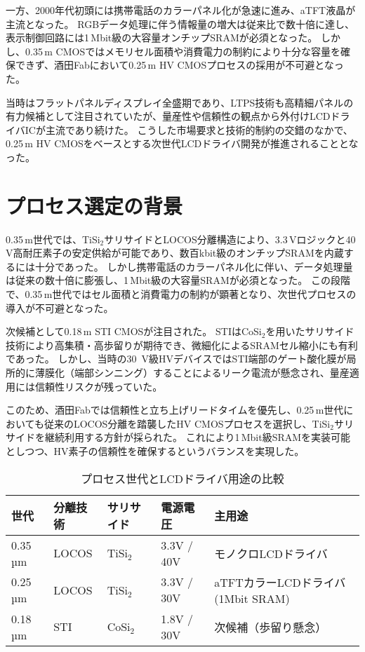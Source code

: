 \documentclass[conference]{IEEEtran}
\begin{document}
一方、2000年代初頭には携帯電話のカラーパネル化が急速に進み、aTFT液晶が主流となった。  
RGBデータ処理に伴う情報量の増大は従来比で数十倍に達し、表示制御回路には1\,Mbit級の大容量オンチップSRAMが必須となった。  
しかし、0.35\,\textmu m CMOSではメモリセル面積や消費電力の制約により十分な容量を確保できず、酒田Fabにおいて0.25\,\textmu m HV CMOSプロセスの採用が不可避となった。  

当時はフラットパネルディスプレイ全盛期であり、LTPS技術も高精細パネルの有力候補として注目されていたが、量産性や信頼性の観点から外付けLCDドライバICが主流であり続けた。  
こうした市場要求と技術的制約の交錯のなかで、0.25\,\textmu m HV CMOSをベースとする次世代LCDドライバ開発が推進されることとなった。

\section{プロセス選定の背景}
0.35\,\textmu m世代では、TiSi$_2$サリサイドとLOCOS分離構造により、3.3\,Vロジックと40\,V高耐圧素子の安定供給が可能であり、数百kbit級のオンチップSRAMを内蔵するには十分であった。  
しかし携帯電話のカラーパネル化に伴い、データ処理量は従来の数十倍に膨張し、1\,Mbit級の大容量SRAMが必須となった。  
この段階で、0.35\,\textmu m世代ではセル面積と消費電力の制約が顕著となり、次世代プロセスの導入が不可避となった。  

次候補として0.18\,\textmu m STI CMOSが注目された。  
STIはCoSi$_2$を用いたサリサイド技術により高集積・高歩留りが期待でき、微細化によるSRAMセル縮小にも有利であった。  
しかし、当時の\SI{30}{V}級HVデバイスではSTI端部のゲート酸化膜が局所的に薄膜化（端部シンニング）することによるリーク電流が懸念され\cite{takeda1994}、量産適用には信頼性リスクが残っていた。  

このため、酒田Fabでは信頼性と立ち上げリードタイムを優先し、0.25\,\textmu m世代においても従来のLOCOS分離を踏襲したHV CMOSプロセスを選択し、TiSi$_2$サリサイドを継続利用する方針が採られた。  
これにより1\,Mbit級SRAMを実装可能としつつ、HV素子の信頼性を確保するというバランスを実現した。

\begin{table}[H]
\centering
\caption{プロセス世代とLCDドライバ用途の比較}
\label{tab:process_comparison}
\begin{tabular}{lllll}
\toprule
世代 & 分離技術 & サリサイド & 電源電圧 & 主用途 \\
\midrule
0.35\,µm & LOCOS & TiSi$_2$ & 3.3V / 40V & モノクロLCDドライバ \\
0.25\,µm & LOCOS & TiSi$_2$ & 3.3V / 30V & aTFTカラーLCDドライバ (1Mbit SRAM) \\
0.18\,µm & STI   & CoSi$_2$ & 1.8V / 30V & 次候補（歩留り懸念） \\
\bottomrule
\end{tabular}
\end{table}
\end{document}
